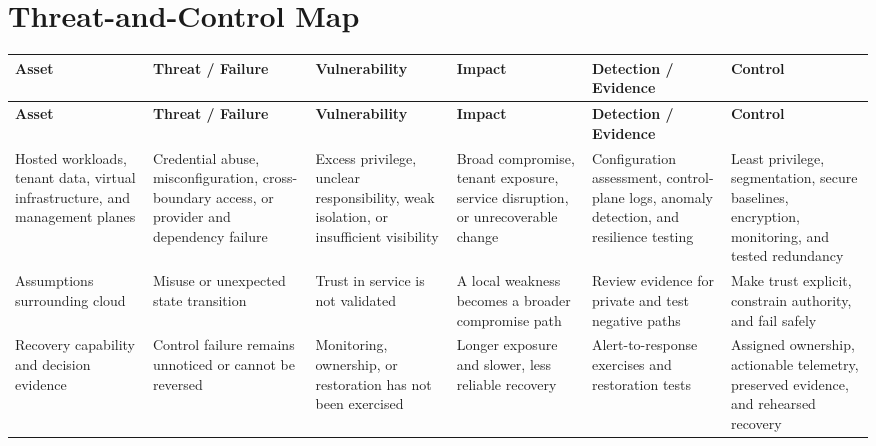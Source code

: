 \documentclass[11pt]{article}
\begin{document}
\section*{Threat-and-Control Map}
\begingroup\scriptsize\setlength{\tabcolsep}{2pt}
\begin{longtable}{>{\RaggedRight\arraybackslash}p{}>{\RaggedRight\arraybackslash}p{}>{\RaggedRight\arraybackslash}p{}>{\RaggedRight\arraybackslash}p{}>{\RaggedRight\arraybackslash}p{}>{\RaggedRight\arraybackslash}p{}}
\toprule\rowcolor{Navy}\color{white}\textbf{Asset} & \color{white}\textbf{Threat / Failure} & \color{white}\textbf{Vulnerability} & \color{white}\textbf{Impact} & \color{white}\textbf{Detection / Evidence} & \color{white}\textbf{Control}\\\midrule
\endfirsthead
\toprule\rowcolor{Navy}\color{white}\textbf{Asset} & \color{white}\textbf{Threat / Failure} & \color{white}\textbf{Vulnerability} & \color{white}\textbf{Impact} & \color{white}\textbf{Detection / Evidence} & \color{white}\textbf{Control}\\\midrule
\endhead
Hosted workloads, tenant data, virtual infrastructure, and management planes & Credential abuse, misconfiguration, cross-boundary access, or provider and dependency failure & Excess privilege, unclear responsibility, weak isolation, or insufficient visibility & Broad compromise, tenant exposure, service disruption, or unrecoverable change & Configuration assessment, control-plane logs, anomaly detection, and resilience testing & Least privilege, segmentation, secure baselines, encryption, monitoring, and tested redundancy\\\midrule
Assumptions surrounding cloud & Misuse or unexpected state transition & Trust in service is not validated & A local weakness becomes a broader compromise path & Review evidence for private and test negative paths & Make trust explicit, constrain authority, and fail safely\\\midrule
Recovery capability and decision evidence & Control failure remains unnoticed or cannot be reversed & Monitoring, ownership, or restoration has not been exercised & Longer exposure and slower, less reliable recovery & Alert-to-response exercises and restoration tests & Assigned ownership, actionable telemetry, preserved evidence, and rehearsed recovery\\\midrule
\bottomrule
\end{longtable}
\endgroup
\end{document}
